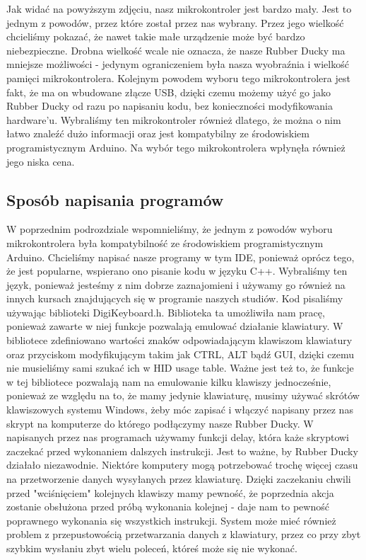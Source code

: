 \documentclass{article}
\begin{document}
Jak widać na powyższym zdjęciu, nasz mikrokontroler jest bardzo mały. Jest to jednym z powodów, przez które został przez nas wybrany. Przez jego wielkość chcieliśmy pokazać, że nawet takie małe urządzenie może być bardzo niebezpieczne. Drobna wielkość wcale nie oznacza, że nasze Rubber Ducky ma mniejsze możliwości - jedynym ograniczeniem była nasza wyobraźnia i wielkość pamięci mikrokontrolera. Kolejnym powodem wyboru tego mikrokontrolera jest fakt, że ma on wbudowane złącze USB, dzięki czemu możemy użyć go jako Rubber Ducky od razu po napisaniu kodu, bez konieczności modyfikowania hardware'u. Wybraliśmy ten mikrokontroler również dlatego, że można o nim łatwo znaleźć dużo informacji oraz jest kompatybilny ze środowiskiem programistycznym Arduino. Na wybór tego mikrokontrolera wpłynęła również jego niska cena.

\subsection{Sposób napisania programów}
W poprzednim podrozdziale wspomnieliśmy, że jednym z powodów wyboru mikrokontrolera była kompatybilność ze środowiskiem programistycznym Arduino. Chcieliśmy napisać nasze programy w tym IDE, ponieważ oprócz tego, że jest popularne, wspierano ono pisanie kodu w języku C++. Wybraliśmy ten język, ponieważ jesteśmy z nim dobrze zaznajomieni i używamy go również na innych kursach znajdujących się w programie naszych studiów.
Kod pisaliśmy używając biblioteki DigiKeyboard.h. Biblioteka ta umożliwiła nam pracę, ponieważ zawarte w niej funkcje pozwalają emulować działanie klawiatury. W bibliotece zdefiniowano wartości znaków odpowiadającym klawiszom klawiatury oraz przyciskom modyfikującym takim jak CTRL, ALT bądź GUI, dzięki czemu nie musieliśmy sami szukać ich w HID usage table. Ważne jest też to, że funkcje w tej bibliotece pozwalają nam na emulowanie kilku klawiszy jednocześnie, ponieważ ze względu na to, że mamy jedynie klawiaturę, musimy używać skrótów klawiszowych systemu Windows, żeby móc zapisać i włączyć napisany przez nas skrypt na komputerze do którego podłączymy nasze Rubber Ducky.
W napisanych przez nas programach używamy funkcji delay, która każe skryptowi zaczekać przed wykonaniem dalszych instrukcji. Jest to ważne, by Rubber Ducky działało niezawodnie. Niektóre komputery mogą potrzebować trochę więcej czasu na przetworzenie danych wysyłanych przez klawiaturę. Dzięki zaczekaniu chwili przed "wciśnięciem" kolejnych klawiszy mamy pewność, że poprzednia akcja zostanie obsłużona przed próbą wykonania kolejnej - daje nam to pewność poprawnego wykonania się wszystkich instrukcji. System może mieć również problem z przepustowością przetwarzania danych z klawiatury, przez co przy zbyt szybkim wysłaniu zbyt wielu poleceń, któreś może się nie wykonać. 
\end{document}
